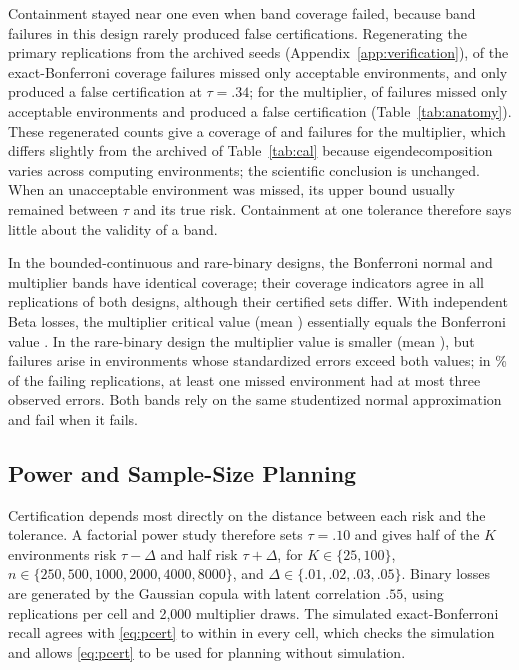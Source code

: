 \documentclass[twoside,11pt]{article}
\begin{document}
Containment stayed near one even when band coverage failed, because band failures in this
design rarely produced false certifications. Regenerating the \AnatReps{} primary replications
from the archived seeds (Appendix~\ref{app:verification}), \AnatExactSafeOnly{} of the
\AnatExactFailures{} exact-Bonferroni coverage failures missed only acceptable environments,
and only \AnatExactFalseCert{} produced a false certification at $\tau=.34$; for the multiplier,
\AnatMultSafeOnly{} of \AnatMultFailures{} failures missed only acceptable environments and
\AnatMultFalseCert{} produced a false certification (Table~\ref{tab:anatomy}). These
regenerated counts give a coverage of \AnatMultCoverageRerun{} and \AnatExactFailures{}
failures for the multiplier, which differs slightly from the archived \CalMultCoverage{} of
Table~\ref{tab:cal} because eigendecomposition varies across computing environments; the
scientific conclusion is unchanged. When an
unacceptable environment was missed, its upper bound usually remained between $\tau$ and its
true risk. Containment at one tolerance therefore says little about the validity of a band.

In the bounded-continuous and rare-binary designs, the Bonferroni normal and multiplier bands
have identical coverage; their coverage indicators agree in all \StressIdenticalReps{}
replications of both designs, although their certified sets differ. With independent Beta
losses, the multiplier critical value (mean \StressContMultCrit) essentially equals the
Bonferroni value \StressBonfCrit. In the rare-binary design the multiplier value is smaller
(mean \StressRareMultCrit), but failures arise in environments whose standardized errors exceed
both values; in \StressRareLowCountShare\% of the failing replications, at least one missed
environment had at most three observed errors. Both bands rely on the same studentized normal
approximation and fail when it fails.

\subsection{Power and Sample-Size Planning}
\label{sec:power}
Certification depends most directly on the distance between each risk and the tolerance. A
factorial power study therefore sets $\tau=.10$ and gives half of the $K$ environments risk
$\tau-\Delta$ and half risk $\tau+\Delta$, for $K\in\{25,100\}$,
$n\in\{250,500,1000,2000,4000,8000\}$, and $\Delta\in\{.01,.02,.03,.05\}$. Binary losses are
generated by the Gaussian copula with latent correlation $.55$, using \PowerReps{}
replications per cell and 2,000 multiplier draws. The simulated exact-Bonferroni recall agrees
with \eqref{eq:pcert} to within \PowerAnalyticMaxDev{} in every cell, which checks the
simulation and allows \eqref{eq:pcert} to be used for planning without simulation.
\end{document}
